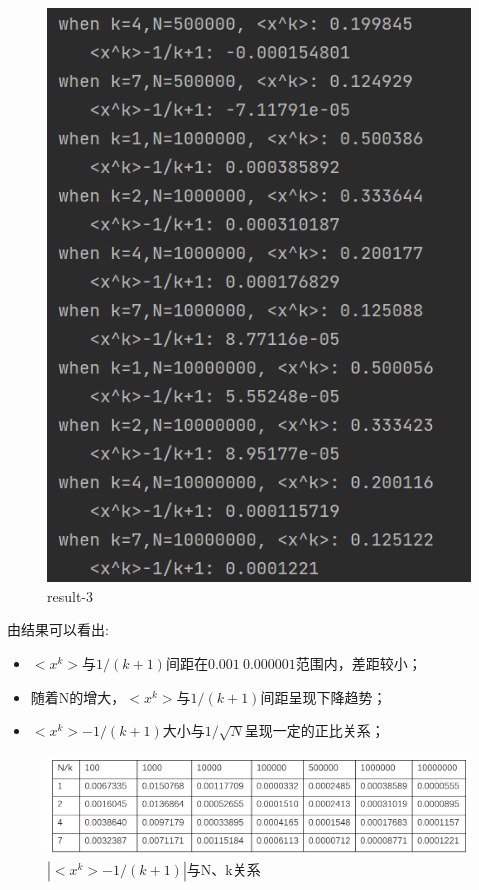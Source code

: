 \documentclass{article}
\begin{document}
\begin{figure}[htbp]
\begin{minipage}[t]{0.3\textwidth}
                        \includegraphics[width=\textwidth]{picture/000.png}
                        \caption{result-3}
                        \end{minipage}
                \end{figure}

                    由结果可以看出:

            
                    \begin{itemize}
                        \item  $<x^k>$与$1/(k+1)$间距在$0.001~0.000001$范围内，差距较小；
                        \item  随着N的增大，$<x^k>$与$1/(k+1)$间距呈现下降趋势；
                        \item  $<x^k>-1/(k+1)$大小与$1/\sqrt{N}$呈现一定的正比关系；    

                    \end{itemize}
                    \begin{figure}[H]
                        \centering
                        \includegraphics[width= .9\textwidth]{picture/bg.png}
                        \caption{$|<x^k>-1/(k+1)|$与N、k关系}
                    \end{figure}                    
\end{document}
